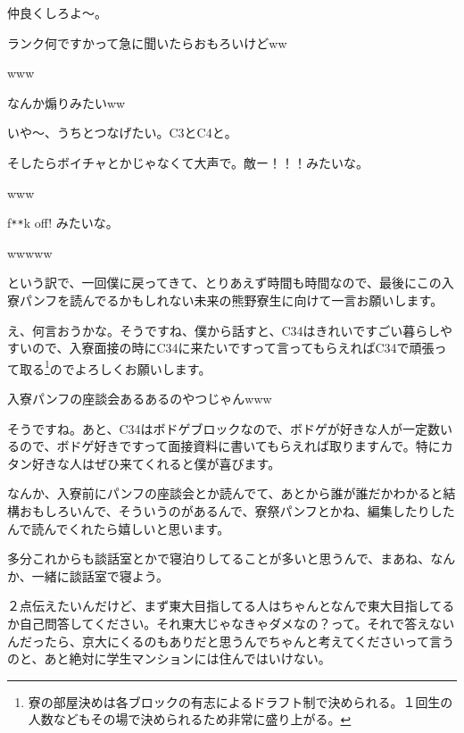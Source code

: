 \begin{multicols}{2}
  
仲良くしろよ～。

  
ランク何ですかって急に聞いたらおもろいけどww

  
www

  
なんか煽りみたいww

  
いや～、うちとつなげたい。C3とC4と。

  
そしたらボイチャとかじゃなくて大声で。敵ー！！！みたいな。

  
www

  
f\verb|**|k off! みたいな。

  
wwwww

  

\vspace{15mm}
\vspace{3mm}

という訳で、一回僕に戻ってきて、とりあえず時間も時間なので、最後にこの入寮パンフを読んでるかもしれない未来の熊野寮生に向けて一言お願いします。

  
え、何言おうかな。そうですね、僕から話すと、C34はきれいですごい暮らしやすいので、入寮面接の時にC34に来たいですって言ってもらえればC34で頑張って取る\footnote{寮の部屋決めは各ブロックの有志によるドラフト制で決められる。１回生の人数などもその場で決められるため非常に盛り上がる。}のでよろしくお願いします。

  
入寮パンフの座談会あるあるのやつじゃんwww

  
そうですね。あと、C34はボドゲブロックなので、ボドゲが好きな人が一定数いるので、ボドゲ好きですって面接資料に書いてもらえれば取りますんで。特にカタン好きな人はぜひ来てくれると僕が喜びます。

  
なんか、入寮前にパンフの座談会とか読んでて、あとから誰が誰だかわかると結構おもしろいんで、そういうのがあるんで、寮祭パンフとかね、編集したりしたんで読んでくれたら嬉しいと思います。

  
多分これからも談話室とかで寝泊りしてることが多いと思うんで、まあね、なんか、一緒に談話室で寝よう。

  
２点伝えたいんだけど、まず東大目指してる人はちゃんとなんで東大目指してるか自己問答してください。それ東大じゃなきゃダメなの？って。それで答えないんだったら、京大にくるのもありだと思うんでちゃんと考えてくださいって言うのと、あと絶対に学生マンションには住んではいけない。


\end{multicols}
